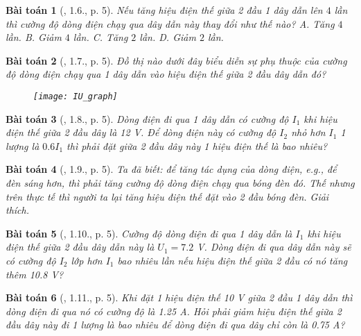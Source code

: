 \documentclass{article}
\newtheorem{baitoan}{Bài toán}
\begin{document}
\begin{baitoan}[\cite{SBT_Vat_Ly_9}, 1.6., p. 5]
	Nếu tăng hiệu điện thế giữa 2 đầu 1 dây dẫn lên $4$ lần thì cường độ dòng điện chạy qua dây dẫn này thay đổi như thế nào? {\sf A.} Tăng $4$ lần. {\sf B.} Giảm $4$ lần. {\sf C.} Tăng $2$ lần. {\sf D.} Giảm $2$ lần.
\end{baitoan}

\begin{baitoan}[\cite{SBT_Vat_Ly_9}, 1.7., p. 5]
	Đồ thị nào dưới đây biểu diễn sự phụ thuộc của cường độ dòng điện chạy qua 1 dây dẫn vào hiệu điện thế giữa 2 đầu dây dẫn đó?
	\begin{figure}[H]
		\centering
		\texttt{[image: IU\_graph]}
	\end{figure}
\end{baitoan}

\begin{baitoan}[\cite{SBT_Vat_Ly_9}, 1.8., p. 5]
	Dòng điện đi qua 1 dây dẫn có cường độ $I_1$ khi hiệu điện thế giữa 2 đầu dây là \emph{12 V}. Để dòng điện này có cường độ $I_2$ nhỏ hơn $I_1$ 1 lượng là $0.6I_1$ thì phải đặt giữa 2 đầu dây này 1 hiệu điện thế là bao nhiêu?
\end{baitoan}

\begin{baitoan}[\cite{SBT_Vat_Ly_9}, 1.9., p. 5]
	Ta đã biết: để tăng tác dụng của dòng điện, e.g., để đèn sáng hơn, thì phải tăng cường độ dòng điện chạy qua bóng đèn đó. Thế nhưng trên thực tế thì người ta lại tăng hiệu điện thế đặt vào 2 đầu bóng đèn. Giải thích.
\end{baitoan}

\begin{baitoan}[\cite{SBT_Vat_Ly_9}, 1.10., p. 5]
	Cường độ dòng điện đi qua 1 dây dẫn là $I_1$ khi hiệu điện thế giữa 2 đầu dây dẫn này là $U_1 = 7.2$ \emph{V}. Dòng điện đi qua dây dẫn này sẽ có cường độ $I_2$ lớp hơn $I_1$ bao nhiêu lần nếu hiệu điện thế giữa 2 đầu có nó tăng thêm \emph{10.8 V}?
\end{baitoan}

\begin{baitoan}[\cite{SBT_Vat_Ly_9}, 1.11., p. 5]
	Khi đặt 1 hiệu điện thế \emph{10 V} giữa 2 đầu 1 dây dẫn thì dòng điện đi qua nó có cường độ là \emph{1.25 A}. Hỏi phải giảm hiệu điện thế giữa 2 đầu dây này đi 1 lượng là bao nhiêu để dòng điện đi qua dây chỉ còn là \emph{0.75 A}?
\end{baitoan}

\end{document}

